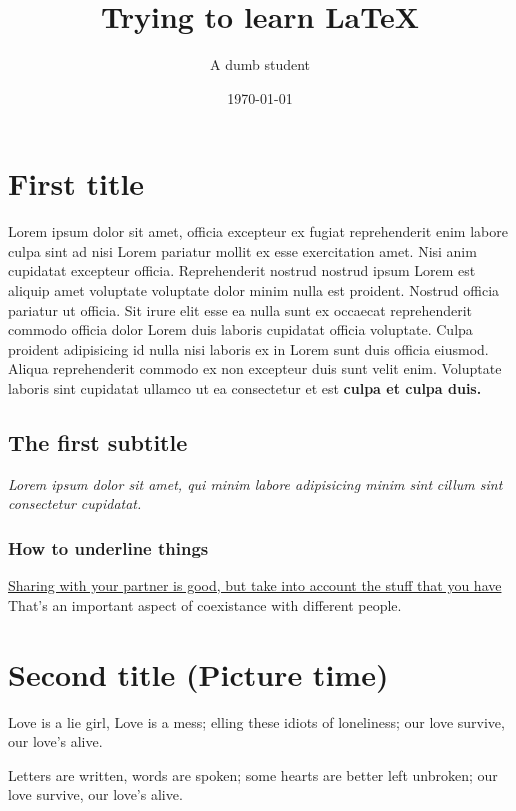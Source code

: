 \documentclass{article}
\title{Trying to learn {\LaTeX}}
\date{\today}
\author{A dumb student}
\begin{document}
\maketitle

\section{First title}

Lorem ipsum dolor sit amet, officia excepteur ex fugiat reprehenderit enim
labore culpa sint ad nisi Lorem pariatur mollit ex esse exercitation amet. Nisi
anim cupidatat excepteur officia. Reprehenderit nostrud nostrud ipsum Lorem est
aliquip amet voluptate voluptate dolor minim nulla est proident. Nostrud
officia pariatur ut officia. Sit irure elit esse ea nulla sunt ex occaecat
reprehenderit commodo officia dolor Lorem duis laboris cupidatat officia
voluptate. Culpa proident adipisicing id nulla nisi laboris ex in Lorem sunt
duis officia eiusmod. Aliqua reprehenderit commodo ex non excepteur duis sunt
velit enim. Voluptate laboris sint cupidatat ullamco ut ea consectetur et est
\textbf{culpa et culpa duis.}

\subsection{The first subtitle}

\textit{Lorem ipsum dolor sit amet, qui minim labore adipisicing minim sint}
\emph{cillum sint consectetur cupidatat.}

\subsubsection{How to underline things}

\underline{Sharing with your partner is good, but take into account the stuff
that you have} That's an important aspect of coexistance with different people.

\section{Second title (Picture time)}

Love is a lie girl, Love is a mess; elling these idiots of loneliness; our love
survive, our love's alive.

Letters are written, words are spoken; some hearts are better left unbroken; our
love survive, our love's alive.
\end{document}
